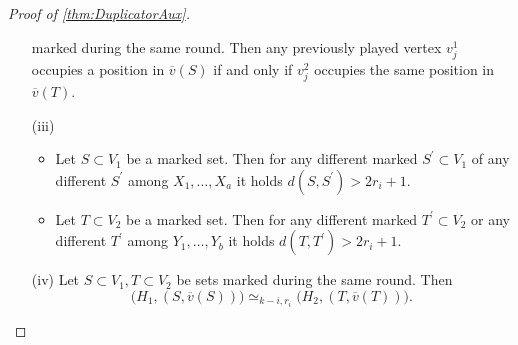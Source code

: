 \documentclass[12pt,notitlepage,a4paper]{article}
\theoremstyle{definition}
\begin{document}
\begin{proof}[Proof of \cref{thm:DuplicatorAux}]
\begin{itemize}
		marked during the same round. Then any previously played
		vertex $v^1_j$ occupies a position in $\overline{v}(S)$
		if and only if $v^2_j$ occupies the same position 
		in $\overline{v}(T)$.
		\item[(iii)] 
			\begin{itemize}
			\item  Let $S\subset V_1$ be a marked set. Then 
			for any different marked $S^\prime \subset V_1$ 
			of any different $S^\prime$ among $X_1,\dots,X_a$
			it holds $d(S,S^\prime)>2r_i + 1$. 
			\item Let $T\subset V_2$ be a marked set. Then
			for any different marked $T^\prime \subset V_2$
			or any different $T^\prime$ among
			$Y_1,\dots, Y_b$  it holds $d(T,T^\prime)>2r_i +1$.
			\end{itemize}
		\item[(iv)] Let $S\subset V_1, T\subset V_2$ be sets
		marked during the same round. Then
		\[
		\big(H_1, (S,\overline{v}(S))\big)\simeq_{k-i,r_i}
		\big(H_2, (T,\overline{v}(T))\big).	\]
					

\end{itemize}
\end{proof}
\end{document}
